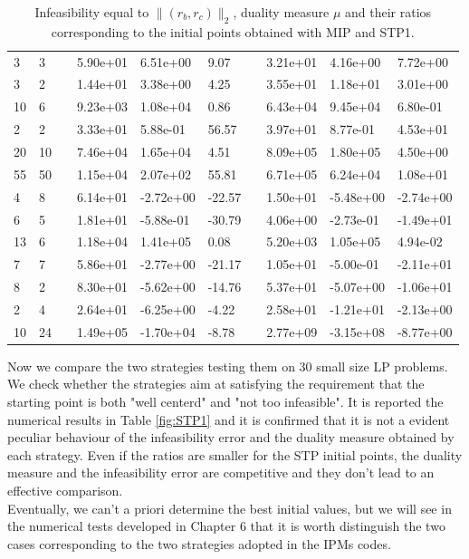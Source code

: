 \documentclass[a4paper,10 pt,titlepage,twoside]{report}
\theoremstyle{plain}
\theoremstyle{definition}
\theoremstyle{remark}
\begin{document}
{{\begin{table}[!h]
\begin{tabular}{llllllllll}
		3 & 3 &  & 5.90e+01 & 6.51e+00 & 9.07 &  & 3.21e+01 & 4.16e+00 & 7.72e+00 \\
		3 & 2 &  & 1.44e+01 & 3.38e+00 & 4.25 &  & 3.55e+01 & 1.18e+01 & 3.01e+00 \\
		10 & 6 &  & 9.23e+03 & 1.08e+04 & 0.86 &  & 6.43e+04 & 9.45e+04 & 6.80e-01 \\
		2 & 2 &  & 3.33e+01 & 5.88e-01 & 56.57 &  & 3.97e+01 & 8.77e-01 & 4.53e+01 \\
		20 & 10 &  & 7.46e+04 & 1.65e+04 & 4.51 &  & 8.09e+05 & 1.80e+05 & 4.50e+00 \\
		55 & 50 &  & 1.15e+04 & 2.07e+02 & 55.81 &  & 6.71e+05 & 6.24e+04 & 1.08e+01 \\
		4 & 8 &  & 6.14e+01 & -2.72e+00 & -22.57 &  & 1.50e+01 & -5.48e+00 & -2.74e+00 \\
		6 & 5 &  & 1.81e+01 & -5.88e-01 & -30.79 &  & 4.06e+00 & -2.73e-01 & -1.49e+01 \\
		13 & 6 &  & 1.18e+04 & 1.41e+05 & 0.08 &  & 5.20e+03 & 1.05e+05 & 4.94e-02 \\
		7 & 7 &  & 5.86e+01 & -2.77e+00 & -21.17 &  & 1.05e+01 & -5.00e-01 & -2.11e+01 \\
		8 & 2 &  & 8.30e+01 & -5.62e+00 & -14.76 &  & 5.37e+01 & -5.07e+00 & -1.06e+01 \\
		2 & 4 &  & 2.64e+01 & -6.25e+00 & -4.22 &  & 2.58e+01 & -1.21e+01 & -2.13e+00 \\
		10 & 24 &  & 1.49e+05 & -1.70e+04 & -8.78 &  & 2.77e+09 & -3.15e+08 & -8.77e+00 \\ \hline
	\end{tabular}\caption{Infeasibility equal to $\lVert (r_{b}, r_{c})\rVert_{2}$, duality measure ${\mu}$ and their ratios corresponding to the initial points obtained with MIP and STP1.}
\end{table}
Now we compare the two strategies testing them on 30 small size LP problems.\\ 
We check whether the strategies aim at satisfying the requirement that the starting point is both "well centerd" and "not too infeasible". It is reported the numerical results in Table \ref{fig:STP1} and it is confirmed that it is not a evident peculiar behaviour of the infeasibility error and the duality measure obtained by each strategy. Even if the ratios are smaller for the STP initial points, the duality measure and the infeasibility error are competitive and they don't lead to an effective comparison. \\Eventually, we can't a priori determine the best initial values, but we will see in the numerical tests developed in Chapter 6 that it is worth distinguish the two cases corresponding to the two strategies adopted in the IPMs codes. 
}}
\end{document}
